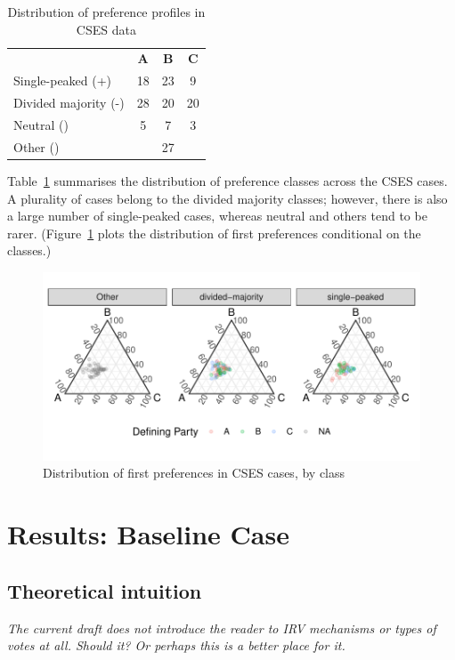 \documentclass[11pt, letter]{article}
\begin{document}
\begin{table}[tb]
	\caption{Distribution of preference profiles in CSES data}
	\label{tab:csesprefs}
	\centering

	\begin{tabular}{lccc}
	\hline

	\toprule
	\textbf{} & \textbf{A} & \textbf{B} & \textbf{C} \\
	\cmidrule{2-4}
	Single-peaked (+) & 18 & 23 & 9  \\
	Divided majority (-) & 28 & 20 & 20  \\
	Neutral () & 5 & 7 & 3  \\
	Other () & & 27 &  \\
	\bottomrule
	\end{tabular}
\end{table}

Table~\ref{tab:csesprefs} summarises the distribution of preference classes across the CSES cases. A plurality of cases belong to the divided majority classes; however, there is also a large number of single-peaked cases, whereas neutral and others tend to be rarer. (Figure~\ref{fig:cses_fp} plots the distribution of first preferences conditional on the classes.)

\begin{figure}[!htb]
	\centering
	\includegraphics[width = 0.6 \textwidth]{../output/figures/cses_fp.pdf}
	\caption{Distribution of first preferences in CSES cases, by class}
	\label{fig:cses_fp}
\end{figure}

\section{Results: Baseline Case}

\subsection{Theoretical intuition}

\emph{The current draft does not introduce the reader to IRV mechanisms or types of votes at all. Should it? Or perhaps this is a better place for it.}
\end{document}
